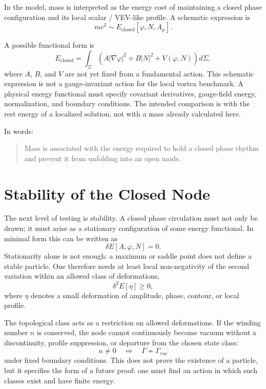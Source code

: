 \documentclass[11pt,a4paper]{article}
\newcommand{\phase}{\varphi}
\begin{document}
In the model, mass is interpreted as the energy cost of maintaining a closed phase configuration and its local scalar / VEV-like profile. A schematic expression is
\begin{equation}
m c^2 \sim E_{\mathrm{closed}}[\phase,N,A_\mu].
\end{equation}

A possible functional form is
\begin{equation}
E_{\mathrm{closed}} = \int_{\Sigma} \left( A |\nabla \phase|^2 + B |N|^2 + V(\phase,N) \right) d\Sigma,
\end{equation}
where $A$, $B$, and $V$ are not yet fixed from a fundamental action. This schematic expression is not a gauge-invariant action for the local vortex benchmark. A physical energy functional must specify covariant derivatives, gauge-field energy, normalization, and boundary conditions. The intended comparison is with the rest energy of a localized solution, not with a mass already calculated here.

In words:
\begin{quote}
Mass is associated with the energy required to hold a closed phase rhythm and prevent it from unfolding into an open mode.
\end{quote}

\section{Stability of the Closed Node}

The next level of testing is stability. A closed phase circulation must not only be drawn; it must arise as a stationary configuration of some energy functional. In minimal form this can be written as
\begin{equation}
\delta E[A,\phase,N]=0.
\end{equation}
Stationarity alone is not enough: a maximum or saddle point does not define a stable particle. One therefore needs at least local non-negativity of the second variation within an allowed class of deformations,
\begin{equation}
\delta^2E[\eta]\geq 0,
\end{equation}
where $\eta$ denotes a small deformation of amplitude, phase, contour, or local profile.

The topological class acts as a restriction on allowed deformations. If the winding number $n$ is conserved, the node cannot continuously become vacuum without a discontinuity, profile suppression, or departure from the chosen state class:
\begin{equation}
n\neq 0 \quad \Rightarrow \quad \Gamma\not\sim\Gamma_{\mathrm{vac}}
\end{equation}
under fixed boundary conditions. This does not prove the existence of a particle, but it specifies the form of a future proof: one must find an action in which such classes exist and have finite energy.
\end{document}

